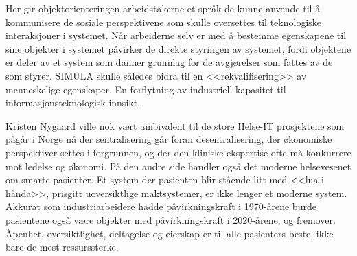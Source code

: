 Her gir objektorienteringen arbeidstakerne et språk de kunne anvende til å kommunisere de sosiale perspektivene som skulle oversettes til teknologiske interaksjoner i systemet. Når arbeiderne selv er med å bestemme egenskapene til sine objekter i systemet påvirker de direkte styringen av systemet, fordi objektene er deler av et system som danner grunnlag for de avgjørelser som fattes av de som styrer. SIMULA skulle således bidra til en <<rekvalifisering>> av menneskelige egenskaper. En forflytning av industriell kapasitet til informasjonsteknologisk innsikt.

Kristen Nygaard ville nok vært ambivalent til de store Helse-IT prosjektene som pågår i Norge nå der sentralisering går foran desentralisering, der økonomiske perspektiver settes i forgrunnen, og der den kliniske ekspertise ofte må konkurrere mot ledelse og økonomi. På den andre side handler også det moderne helsevesenet om smarte pasienter. Et system der pasienten blir stående litt med <<lua i hånda>>, prisgitt uoversiktlige maktsystemer, er ikke lenger et moderne system. Akkurat som industriarbeidere hadde påvirkningskraft i 1970-årene burde pasientene også være objekter med påvirkningskraft i 2020-årene, og fremover. Åpenhet, oversiktlighet, deltagelse og eierskap er til alle pasienters beste, ikke bare de mest ressurssterke.
